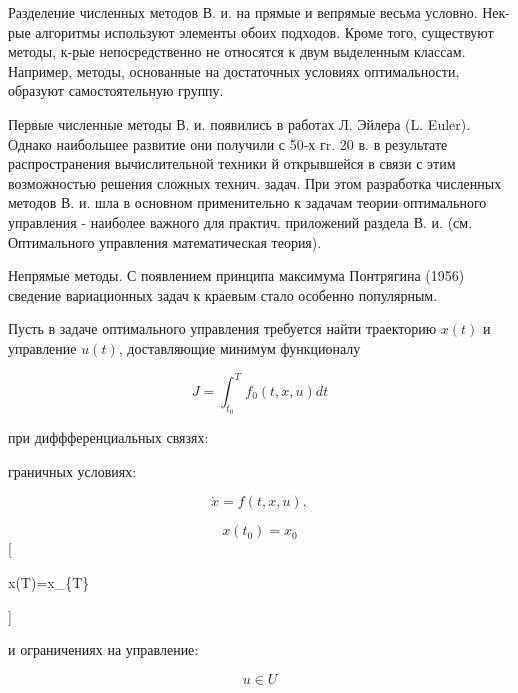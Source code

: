 \documentclass[10pt]{article}
\begin{document}
Разделение численных методов В. и. на прямые и вепрямые весьма условно. Нек-рые алгоритмы используют элементы обоих подходов. Кроме того, существуют методы, к-рые непосредственно не относятся к двум выделенным классам. Например, методы, основанные на достаточных условиях оптимальности, образуют самостоятельную группу.



Первые численные методы В. и. появились в работах Л. Эйлера (L. Euler). Однако наибольшее развитие они получили с 50-х гr. 20 в. в результате распространения вычислительной техники й открывшейся в связи с этим возможностью решения сложных технич. задач. При этом разработка численных методов В. и. шла в основном применительно к задачам теории оптимального управления - наиболее важного для практич. приложений раздела В. и. (см. Оптимального управления математическая теория).



Непрямые методы. С появлением принципа максимума Понтрягина (1956) сведение вариационных задач к краевым стало особенно популярным.



Пусть в задаче оптимального управления требуется найти траекторию $x(t)$ и управление $u(t)$, доставляющие минимум функционалу



\[

J=\int_{t_{0}}^{T} f_{0}(t, x, u) d t

\]



при диффференциальных связях:



граничных условиях:



\[

\dot{x}=f(t, x, u),

\]



\[

x\left(t_{0}\right)=x_{0}

\][



x(T)=x\_\{T\}

]



и ограничениях на управление:



\[

u \in U

\]
\end{document}
